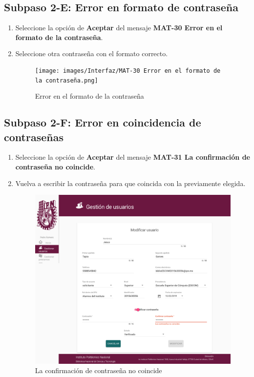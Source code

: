 \subsection{Subpaso 2-E: Error en formato de contraseña}
\begin{enumerate}
	\item Seleccione la opción de \textbf{Aceptar} del mensaje
\textbf{MAT-30 Error en el formato de la contraseña}.
	\item Seleccione otra contraseña con el formato correcto.
	\begin{figure}[hbtp]
	\texttt{[image: images/Interfaz/MAT-30 Error en el formato de la contraseña.png]}
	\caption{Error en el formato de la contraseña}
	\end{figure}
\end{enumerate}

\subsection{Subpaso 2-F: Error en coincidencia de contraseñas}
\begin{enumerate}
	\item Seleccione la opción de \textbf{Aceptar} del mensaje
\textbf{MAT-31 La confirmación de contraseña no coincide}.
	\item Vuelva a escribir la contraseña para que coincida con la previamente elegida.
	\begin{figure}[hbtp]
	\includegraphics[scale=0.3]{images/Interfaz/MAT-31 La confirmación de contraseña no coincide.png}
	\caption{La confirmación de contraseña no coincide}
	\end{figure}
\end{enumerate}

